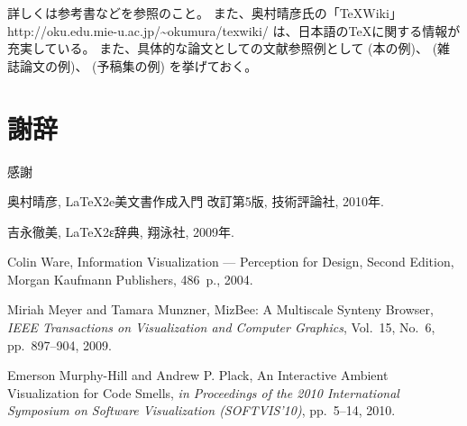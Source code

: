 \documentclass[a4paper,11pt]{jreport}
\begin{document}
詳しくは参考書\cite{okumura2010,yoshinaga2009}などを参照のこと。
また、奥村晴彦氏の「\TeX Wiki」
http://oku.edu.mie-u.ac.jp/\textasciitilde{}okumura/texwiki/
は、日本語の\TeX に関する情報が充実している。
また、具体的な論文としての文献参照例として
(本の例)\cite{ware2004}、
(雑誌論文の例)\cite{meyer2009}、
(予稿集の例)\cite{hill2010}
を挙げておく。

\chapter*{謝辞}

感謝

\newpage


\renewcommand{\bibname}{参考文献}

%
%

\begin{thebibliography}{1}
奥村晴彦, LaTeX2e美文書作成入門 改訂第5版, 技術評論社, 2010年.

吉永徹美, LaTeX2ε辞典, 翔泳社, 2009年.

Colin Ware, Information Visualization --- Perception for Design, Second Edition, Morgan Kaufmann Publishers, 486~p., 2004.

Miriah Meyer and Tamara Munzner, MizBee: A Multiscale Synteny Browser, {\em IEEE Transactions on Visualization and Computer Graphics}, Vol.~15, No.~6, pp.~897--904, 2009.

Emerson Murphy-Hill and Andrew P. Plack, An Interactive Ambient Visualization for Code Smells, {\em in Proceedings of the 2010 International Symposium on Software Visualization (SOFTVIS’10)}, pp.~5--14, 2010.

\end{thebibliography}
\end{document}

